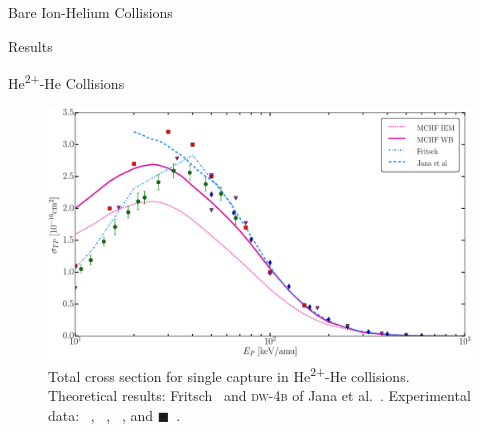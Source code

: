 \documentclass[letterpaper, 11 pt]{report}
\begin{document}
\begin{chapter}{Bare Ion-Helium Collisions \label{chap:p-he2p-he}}
\begin{section}{Results \label{sec:phe2p-res}}
\begin{subsection}{\texorpdfstring{He\textsuperscript{2+}}{He2+}-He Collisions
                         \label{sec:he2phe-res}}
         \begin{figure}[t]
            \centering
            \includegraphics[width = 0.95 \linewidth]{./images/he2phe/he2phe-TP.eps}
            \caption[Total cross section for single capture in He\textsuperscript{2+}-He
                     collisions.]{Total cross section for single capture in He\textsuperscript{2+}-He
                     collisions. Theoretical results: Fritsch~\cite{Fritsch-94} and \textsc{dw-4b} of
                     Jana et al.~\cite{JMP-15}.
                     Experimental data: {\color{blue}{$\blacklozenge$}}~\cite{SG85},
                     {\color{OliveGreen}{$\bullet$}}~\cite{SG89},
                     {\color{RedViolet}{$\blacktriangledown$}}~\cite{Dubois87}, and
                     {\color{red}$\blacksquare$}~\cite{Rudd85}. \label{fig:he2phe-tp}}
         \end{figure}


\end{subsection}
\end{section}
\end{chapter}
\end{document}
